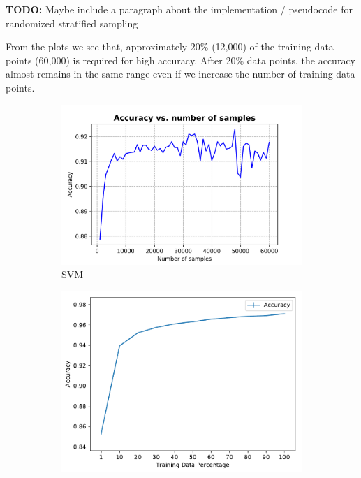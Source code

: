 \documentclass[10pt]{scrartcl}
\begin{document}
\textbf{TODO:} Maybe include a paragraph about the implementation / pseudocode for randomized stratified sampling

From the plots we see that, approximately 20\% (12,000) of the training data points (60,000) is required for high accuracy. After 20\% data points, the accuracy almost remains in the same range even if we increase the number of training data points.

\begin{figure}[H]
	\centering
	\begin{subfigure}{0.4\linewidth}
		\centering
		\includegraphics[width=1\linewidth]{figures/accuracy_vs_samples_linearsvm_default.png}
		\caption{SVM}\label{fig:1a}		
	\end{subfigure}
	\begin{subfigure}{0.35\linewidth}
		\centering
		\includegraphics[width=1\linewidth]{figures/KNN_accuracy_vs_tss_with_fixed_k.pdf}

\end{subfigure}
\end{figure}
\end{document}
